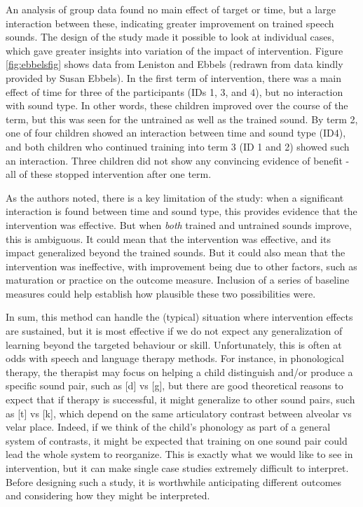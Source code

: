 \documentclass{krantz}
\begin{document}
An analysis of group data found no main effect of target or time, but a large interaction between these, indicating greater improvement on trained speech sounds. The design of the study made it possible to look at individual cases, which gave greater insights into variation of the impact of intervention. Figure \ref{fig:ebbelsfig} shows data from Leniston and Ebbels (redrawn from data kindly provided by Susan Ebbels). In the first term of intervention, there was a main effect of time for three of the participants (IDs 1, 3, and 4), but no interaction with sound type. In other words, these children improved over the course of the term, but this was seen for the untrained as well as the trained sound. By term 2, one of four children showed an interaction between time and sound type (ID4), and both children who continued training into term 3 (ID 1 and 2) showed such an interaction. Three children did not show any convincing evidence of benefit - all of these stopped intervention after one term.

As the authors noted, there is a key limitation of the study: when a significant interaction is found between time and sound type, this provides evidence that the intervention was effective. But when \emph{both} trained and untrained sounds improve, this is ambiguous. It could mean that the intervention was effective, and its impact generalized beyond the trained sounds. But it could also mean that the intervention was ineffective, with improvement being due to other factors, such as maturation or practice on the outcome measure. Inclusion of a series of baseline measures could help establish how plausible these two possibilities were.

In sum, this method can handle the (typical) situation where intervention effects are sustained, but it is most effective if we do not expect any generalization of learning beyond the targeted behaviour or skill. Unfortunately, this is often at odds with speech and language therapy methods. For instance, in phonological therapy, the therapist may focus on helping a child distinguish and/or produce a specific sound pair, such as {[}d{]} vs {[}g{]}, but there are good theoretical reasons to expect that if therapy is successful, it might generalize to other sound pairs, such as {[}t{]} vs {[}k{]}, which depend on the same articulatory contrast between alveolar vs velar place. Indeed, if we think of the child's phonology as part of a general system of contrasts, it might be expected that training on one sound pair could lead the whole system to reorganize. This is exactly what we would like to see in intervention, but it can make single case studies extremely difficult to interpret. Before designing such a study, it is worthwhile anticipating different outcomes and considering how they might be interpreted.
\end{document}

